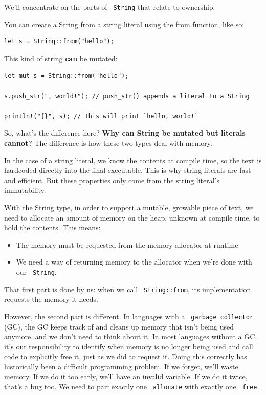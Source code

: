 \documentclass[11pt]{article}
\let\OldTexttt\texttt
\renewcommand{\texttt}[1]{\OldTexttt{\color{MidnightBlue} #1}}
\begin{document}
We’ll concentrate on the parts of \texttt{String} that relate to ownership.

You can create a String from a string literal using the from function, like so:
\begin{verbatim}
let s = String::from("hello");
\end{verbatim}

This kind of string \textbf{can} be mutated:
\begin{verbatim}
let mut s = String::from("hello");

s.push_str(", world!"); // push_str() appends a literal to a String

println!("{}", s); // This will print `hello, world!`
\end{verbatim}

So, what’s the difference here? \textbf{Why can String be mutated but literals cannot?} The difference
is how these two types deal with memory.

In the case of a string literal, we know the contents at compile time, so the text is
hardcoded directly into the final executable. This is why string literals are fast and
efficient. But these properties only come from the string literal’s immutability.

With the String type, in order to support a mutable, growable piece of text, we need to
allocate an amount of memory on the heap, unknown at compile time, to hold the contents. This
means:
\begin{itemize}
\item The memory must be requested from the memory allocator at runtime
\item We need a way of returning memory to the allocator when we're done with our \texttt{String}.
\end{itemize}

That first part is done by us: when we call \texttt{String::from}, its implementation requests the
memory it needs.

However, the second part is different. In languages with a \texttt{garbage collector} (GC), the GC
keeps track of and cleans up memory that isn’t being used anymore, and we don’t need to think
about it. In most languages without a GC, it’s our responsibility to identify when memory is
no longer being used and call code to explicitly free it, just as we did to request it. Doing
this correctly has historically been a difficult programming problem. If we forget, we’ll
waste memory. If we do it too early, we’ll have an invalid variable. If we do it twice, that’s
a bug too. We need to pair exactly one \texttt{allocate} with exactly one \texttt{free}.
\end{document}
